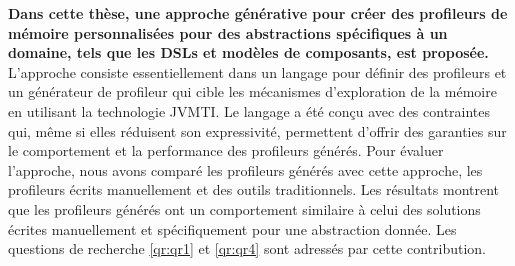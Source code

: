 \textbf{Dans cette thèse, une approche générative pour créer des profileurs de mémoire personnalisées pour des abstractions spécifiques à un domaine, tels que les DSLs et modèles de composants, est proposée.}
L'approche consiste essentiellement dans un langage pour définir des profileurs et un générateur de profileur qui cible les mécanismes d'exploration de la mémoire en utilisant la technologie JVMTI.
Le langage a été conçu avec des contraintes qui, même si elles réduisent son expressivité, permettent d’offrir des garanties sur le comportement et la performance des profileurs générés. Pour évaluer l'approche, nous avons comparé les profileurs générés avec cette approche, les profileurs écrits manuellement et des outils traditionnels. Les résultats montrent que les profileurs générés ont un comportement similaire à celui des solutions écrites manuellement et spécifiquement pour une abstraction donnée. Les questions de recherche \ref{qr:qr1} et \ref{qr:qr4} sont adressés par cette contribution.


